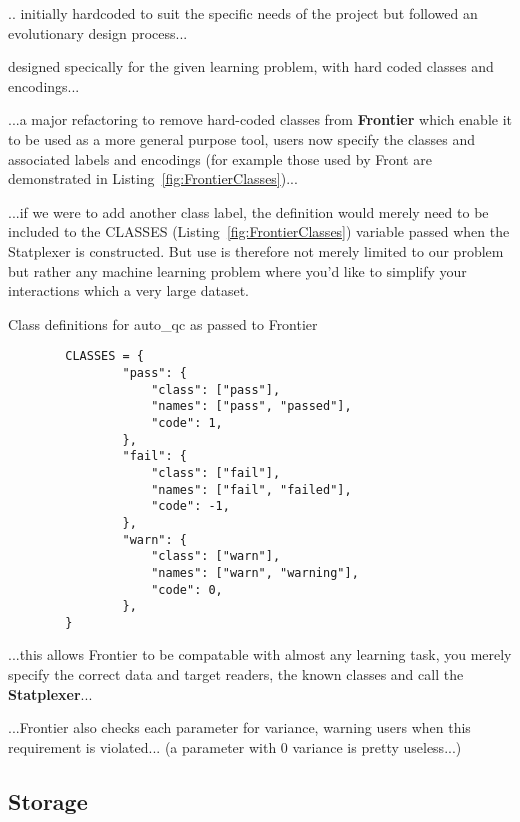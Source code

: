 .. initially hardcoded to suit the specific needs of the project but followed
an evolutionary design process...

designed specically for the given learning problem, with hard coded
classes and encodings...

...a major refactoring to remove hard-coded classes from \textbf{Frontier} which
enable it to be used as a more general purpose tool, users now specify the
classes and associated labels and encodings (for example those used by Front are
demonstrated in Listing~\ref{fig:FrontierClasses})...

...if we were to add another
class label, the definition would merely need to be included to the CLASSES
(Listing~\ref{fig:FrontierClasses}) variable passed when the Statplexer is
constructed. But use is therefore not merely limited to our problem but rather
any machine learning problem where you'd like to simplify your interactions
which a very large dataset.

\begin{listing}[H]
    \caption[FrontierClasses]{Class definitions for auto\_qc as passed to Frontier}
    \label{fig:FrontierClasses}
    \begin{verbatim}
        CLASSES = {
                "pass": {
                    "class": ["pass"],
                    "names": ["pass", "passed"],
                    "code": 1,
                },
                "fail": {
                    "class": ["fail"],
                    "names": ["fail", "failed"],
                    "code": -1,
                },
                "warn": {
                    "class": ["warn"],
                    "names": ["warn", "warning"],
                    "code": 0,
                },
        }
    \end{verbatim}
\end{listing}

...this allows Frontier to be compatable with almost any learning task, you
merely specify the correct data and target readers, the known classes and call
the \textbf{Statplexer}...

...Frontier also checks each parameter for variance, warning users when this
requirement is violated... (a parameter with 0 variance is pretty useless...)

\subsection{Storage}

